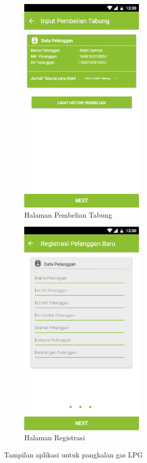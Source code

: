 \begin{enumerate}[1.]
\begin{figure}[H]
		\begin{subfigure}[t]{6cm}
			\center
			\includegraphics [width = 6cm]{gambar/and/pembelian}
			\caption{Halaman Pembelian Tabung}\label{pembelian}		
		\end{subfigure}\hspace{0.3cm}
		\begin{subfigure}[t]{6cm}
			\center
			\includegraphics [width = 6cm]{gambar/and/registrasi}
			\caption{Halaman Registrasi}\label{registrasi}		
		\end{subfigure}
		\caption{Tampilan aplikasi untuk pangkalan gas LPG }\label{appPangkalan}
	\end{figure}


\end{enumerate}
